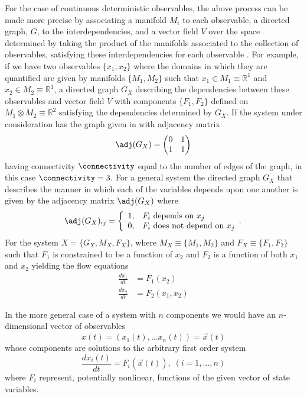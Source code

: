 For the case of continuous deterministic observables, the above process can be made more precise by associating a manifold $M_i$ to each observable, a directed graph, $G$, to the interdependencies, and a vector field $V$ over the space determined by taking the product of the manifolds associated to the collection of observables, satisfying these interdependencies for each observable  \cite{Deville}. For example, if we have two observables $\{x_1,x_2\}$ where the domains in which they are quantified are given by manifolds $\{M_1,M_2\}$ such that $x_1 \in M_1 \equiv \mathbb{R}^1$ and $x_2 \in M_2 \equiv \mathbb{R}^1$, a directed graph $G_X$ describing the dependencies between these observables and vector field $V$ with components $\{F_1,F_2\}$ defined on $M_1 \otimes M_2 \equiv \mathbb{R}^2$ satisfying the dependencies determined by $G_X$. If the system under consideration has the graph given in 
% 
with adjacency matrix
$$
\adj(G_X) = \begin{pmatrix}
0 & 1 \\
1 & 1
\end{pmatrix}
$$
having connectivity $\connectivity$ equal to the number of edges of the graph, in this case $\connectivity = 3$. For a general system the directed graph $G_X$ that describes the manner in which each of the variables depends upon one another is given by the adjacency matrix $\adj(G_X)$ where
 \begin{displaymath}
   \adj(G_X)_{ij} = \left\{
     \begin{array}{ll}
       1, & F_i \hbox{ depends on } x_j\\
       0, & F_i \hbox{ does not depend on } x_j
     \end{array}.
   \right.
\end{displaymath} For the system $X = \{G_X, M_X, F_X\}$, where $M_X \equiv \{M_1,M_2\}$ and $F_X \equiv \{F_1,F_2\}$ such that $F_1$ is constrained to be a function of $x_2$ and $F_2$ is a function of both $x_1$ and $x_2$ yielding the flow equations
\begin{align*}
\frac{dx_1}{dt} & = F_1(x_2)\\
\frac{dx_2}{dt} & = F_2(x_1,x_2)
\end{align*}

In the more general case of a system with $n$ components we would have an $n$-dimensional vector of observables
$$
x(t) = (x_1(t), \ldots x_n(t)) = \vec{x}(t)
$$
whose components are solutions to the arbitrary first order system
$$
\frac{dx_i(t)}{dt} = F_i(\vec{x}(t)), \; (i=1,\ldots,n)
$$
where $F_i$ represent, potentially nonlinear, functions of the given vector of state variables.

